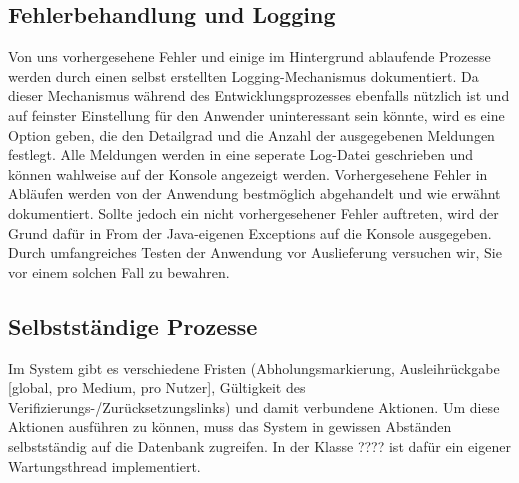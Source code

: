 \documentclass{article}
\begin{document}
\subsection{Fehlerbehandlung und Logging}
Von uns vorhergesehene Fehler und einige im Hintergrund ablaufende Prozesse werden durch einen selbst erstellten Logging-Mechanismus dokumentiert. Da dieser Mechanismus während des Entwicklungsprozesses ebenfalls nützlich ist und auf feinster Einstellung für den Anwender uninteressant sein könnte, wird es eine Option geben, die den Detailgrad und die Anzahl der ausgegebenen Meldungen festlegt. Alle Meldungen werden in eine seperate Log-Datei geschrieben und können wahlweise auf der Konsole angezeigt werden. Vorhergesehene Fehler in Abläufen werden von der Anwendung bestmöglich abgehandelt und wie erwähnt dokumentiert. Sollte jedoch ein nicht vorhergesehener Fehler auftreten, wird der Grund dafür in From der Java-eigenen Exceptions auf die Konsole ausgegeben. Durch umfangreiches Testen der Anwendung vor Auslieferung versuchen wir, Sie vor einem solchen Fall zu bewahren.
\subsection{Selbstständige Prozesse}
Im System gibt es verschiedene Fristen (Abholungsmarkierung, Ausleihrückgabe [global, pro Medium, pro Nutzer], Gültigkeit des Verifizierungs-/Zurücksetzungslinks) und damit verbundene Aktionen. Um diese Aktionen ausführen zu können, muss das System in gewissen Abständen selbstständig auf die Datenbank zugreifen. In der Klasse ???? ist dafür ein eigener Wartungsthread implementiert.
\end{document}
